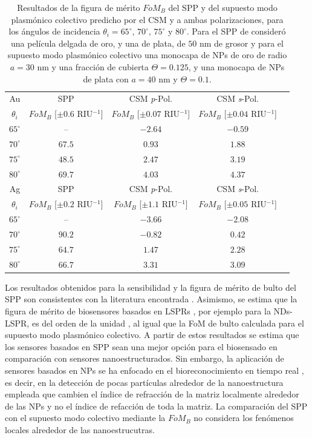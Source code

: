 \begin{table}[h!]
\centering
\caption{Resultados de la figura de mérito $\textit{FoM}_B$ del SPP y del supuesto modo  plasmónico colectivo predicho por el CSM y a ambas polarizaciones, para los ángulos de incidencia $\theta_i = 65^\circ,\,70^\circ,\, 75^\circ$ y $80^\circ$. Para el SPP de consideró una película delgada de oro, y una de plata, de $50$ nm de grosor y para el supuesto modo  plasmónico colectivo una monocapa de NPs de oro de radio $a=30$ nm y una fracción de cubierta $\Theta=0.125$, y una monocapa de NPs de plata con $a=40$ nm y $\Theta=0.1$.}\vspace*{-.7em}
\label{tab:FoM}\small
\begin{tabular}{c||c||ccc}
Au & SPP  & CSM \emph{p}-Pol. 	& CSM \emph{s}-Pol. \\ 
$\theta_i$ &  $\textit{FoM}_B$ [$\pm 0.6$ RIU$^{-1}$]	  &  $\textit{FoM}_B$ [$\pm 0.07$ RIU$^{-1}$]		&  $\textit{FoM}_B$  [$\pm 0.04$ RIU$^{-1}$]\\ \hline
$65^\circ$ & --			  &	$-2.64$ & $-0.59$\\
$70^\circ$ & $67.5$ &	$0.93$ & $1.88$\\
$75^\circ$ & $48.5$ &	$2.47$ & $3.19$\\
$80^\circ$ & $69.7$ &	$4.03$ & $4.37$\\
\hline \hline
Ag & SPP  & CSM \emph{p}-Pol. 	& CSM \emph{s}-Pol. \\ 
$\theta_i$ &  $\textit{FoM}_B$ [$\pm 0.2$ RIU$^{-1}$]	  &  $\textit{FoM}_B$ [$\pm 1.1$ RIU$^{-1}$]		&  $\textit{FoM}_B$  [$\pm 0.05$ RIU$^{-1}$]\\ \hline
$65^\circ$ & -- 			  &	$-3.66$ & $-2.08$\\
$70^\circ$ & $90.2$ &	$-0.82$ & $0.42$\\
$75^\circ$ & $64.7$ &	$1.47$  & $2.28$\\
$80^\circ$ & $66.7$ &	$3.31$  & $3.09$
\end{tabular}
\end{table}


Los resultados obtenidos para la sensibilidad y la figura de mérito de bulto del SPP son consistentes con la literatura encontrada \cite{estevez2014trends,danilov2018ultra,svedendahl2009refractometric}. Asimismo, se estima que la figura de mérito de biosensores basados en LSPRs , por ejemplo para la NDs-LSPR, es del orden de la unidad \cite{svedendahl2009refractometric}, al igual que la FoM de bulto calculada para el supuesto modo  plasmónico colectivo. A partir de estos resultados se estima que los sensores basados en SPP sean una mejor opción para el biosensado en comparación con sensores nanoestructurados. Sin embargo, la aplicación de sensores basados en NPs  se ha enfocado en el bioreconocimiento en tiempo real \cite{estevez2014trends,svedendahl2009refractometric}, es decir, en la detección de pocas partículas alrededor de la nanoestructura empleada que cambien el índice de refracción de la matriz localmente alrededor de las NPs y no el índice de refacción de toda la matriz. La comparación del SPP  con el supuesto modo colectivo mediante la $\textit{FoM}_B$ no considera los fenómenos locales alrededor de las nanoestrucutras.